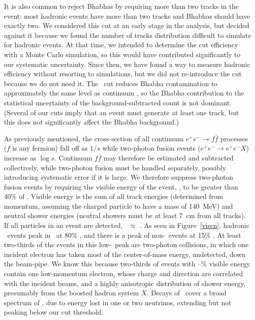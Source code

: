 \documentclass{cornell}
\begin{document}
It is also common to reject Bhabhas by requiring more than two tracks
in the event: most hadronic events have more than two tracks and
Bhabhas should have exactly two.  We considered this cut at an early
stage in the analysis, but decided against it because we found the
number of tracks distribution difficult to simulate for hadronic
events.  At that time, we intended to determine the cut efficiency
with a Monte Carlo simulation, so this would have contributed
significantly to our systematic uncertainty.  Since then, we have
found a way to measure hadronic efficiency without resorting to
simulations, but we did not re-introduce the cut because we do not
need it.  The \pmax\ cut reduces Bhabha contamination to approximately
the same level as continuum \qqbar, so the Bhabha contribution to the
statistical uncertainty of the background-subtracted count is not
dominant.  (Several of our cuts imply that an event must generate at
least one track, but this does not significantly affect the Bhabha
background.)

As previously mentioned, the cross-section of all continuum $e^+e^-
\to f\bar{f}$ processes ($f$ is any fermion) fall off as $1/s$ while
two-photon fusion events ($e^+e^- \to e^+e^- X$) increase as $\log s$.
Continuum $f\bar{f}$ may therefore be estimated and subtracted
collectively, while two-photon fusion must be handled separately,
possibly introducing systematic error if it is large.  We therefore
suppress two-photon fusion events by requiring the visible energy of
the event, \visen, to be greater than 40\% of \ecm.  Visible energy is
the sum of all track energies (determined from momentum, assuming the
charged particle to have a mass of 140~MeV) and neutral shower
energies (neutral showers must be at least 7~cm from all tracks).  If
all particles in an event are detected, \visen\ $\approx$ \ecm.  As
seen in Figure~\ref{visen}, hadronic \ups\ events peak in \visen\ at
80\% \ecm, and there is a peak of non-\ups\ events at 15\% \ecm.  At
least two-thirds of the events in this low-\visen\ peak are two-photon
collisions, in which one incident electron has taken most of the
center-of-mass energy, undetected, down the beam-pipe.  We know this
because two-thirds of events with \bork--\bork\% visible energy
contain one low-momentum electron, whose charge and direction are
correlated with the incident beams, and a highly anisotropic
distribution of shower energy, presumably from the boosted hadron
system $X$.  Decays of \tautau\ cover a broad spectrum of \visen, due
to energy lost in one or two neutrinos, extending but not peaking
below our cut threshold.
\end{document}
